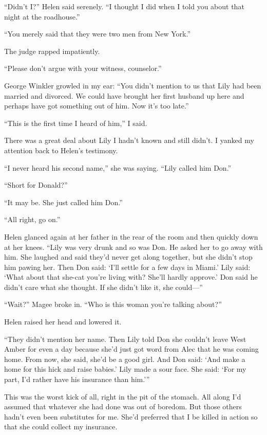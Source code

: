 \documentclass{novel}
\begin{document}
“Didn’t I?” Helen said serenely. “I thought I did when I told you about that night at the roadhouse.”

“You merely said that they were two men from New York.”

The judge rapped impatiently.

“Please don’t argue with your witness, counselor.”

George Winkler growled in my ear: “You didn’t mention to us that Lily had been married and divorced. We could have brought her first husband up here and perhaps have got something out of him. Now it’s too late.”

“This is the first time I heard of him,” I said.

There was a great deal about Lily I hadn’t known and still didn’t. I yanked my attention back to Helen’s \mbox{testimony}.

“I never heard his second name,” she was saying. “Lily called him Don.”

“Short for Donald?”

“It may be. She just called him Don.”

“All right, go on.”

\scenestars

Helen glanced again at her father in the rear of the room and then quickly down at her knees. “Lily was very drunk and so was Don. He asked her to go away with him. She laughed and said they’d never get along together, but she didn’t stop him pawing her. Then Don said: ‘I’ll settle for a few days in Miami.’ Lily said: ‘What about that she-cat you’re living with? She’ll hardly approve.’ Don said he didn’t care what she thought. If she didn’t like it, she could—”

“Wait?” Magee broke in. “Who is this woman you’re talking about?”

Helen raised her head and lowered it.

“They didn’t mention her name. Then Lily told Don she couldn’t leave West Amber for even a day because she’d just got word from Alec that he was coming home. From now, she said, she’d be a good girl. And Don said: ‘And make a home for this hick and raise babies.’ Lily made a sour face. She said: ‘For my part, I’d rather have his insurance than him.’”

This was the worst kick of all, right in the pit of the stomach. All along I’d assumed that whatever she had done was out of boredom. But those others hadn’t even been substitutes for me. She’d preferred that I be killed in action so that she could collect my insurance.
\end{document}
